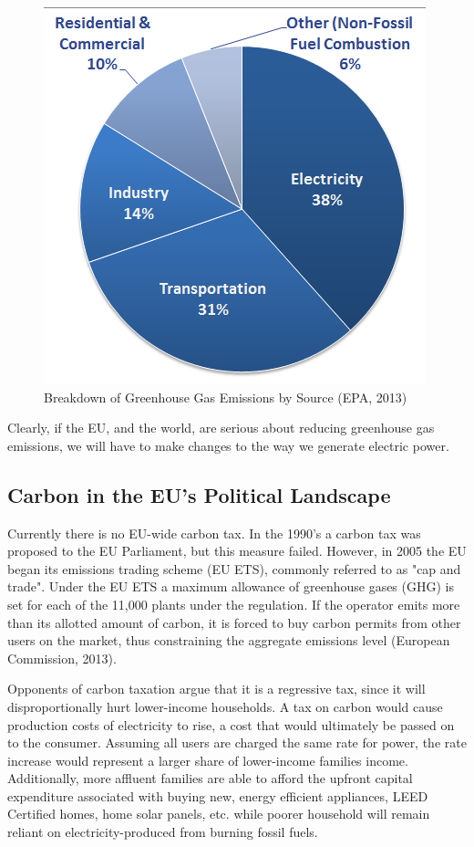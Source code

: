 \documentclass{article}
\begin{document}
\begin{figure}[H]
	\begin{center}
	\includegraphics[scale = .5]{Figures/gases-co2.png}
	\caption{Breakdown of Greenhouse Gas Emissions by Source (EPA, 2013)}
	\end{center}
\end{figure}

Clearly, if the EU, and the world, are serious about reducing greenhouse gas emissions, we will have to make changes to the way we generate electric power.

\subsection{Carbon in the EU's Political Landscape}

Currently there is no EU-wide carbon tax. In the 1990's a carbon tax was proposed to the EU Parliament, but this measure failed. However, in 2005 the EU began its emissions trading scheme (EU ETS), commonly referred to as "cap and trade". Under the EU ETS a maximum allowance of greenhouse gases (GHG) is set for each of the 11,000 plants under the regulation. If the operator emits more than its allotted amount of carbon, it is forced to buy carbon permits from other users on the market, thus constraining the aggregate emissions level (European Commission, 2013). \*

Opponents of carbon taxation argue that it is a regressive tax, since it will disproportionally hurt lower-income households. A tax on carbon would cause production costs of electricity to rise, a cost that would ultimately be passed on to the consumer. Assuming all users are charged the same rate for power, the rate increase would represent a larger share of lower-income families income. Additionally, more affluent families are able to afford the upfront capital expenditure associated with buying new, energy efficient appliances, LEED Certified homes, home solar panels, etc. while poorer household will remain reliant on electricity-produced from burning fossil fuels.
\end{document}
